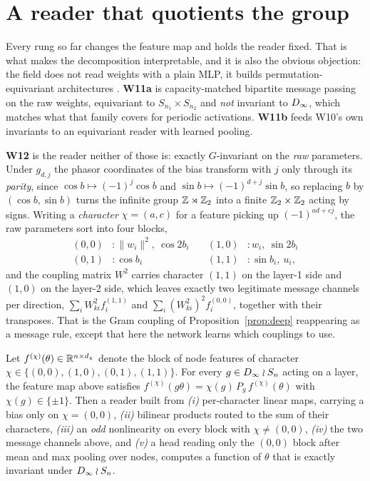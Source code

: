 \section{A reader that quotients the group}\label{sec:reader}

Every rung so far changes the feature map and holds the reader fixed. That is what makes the
decomposition interpretable, and it is also the obvious objection: the field does not read weights
with a plain MLP, it builds permutation-equivariant architectures
\citep{navon2023dws,zhou2023nfn,lim2024gmn,kofinas2024graph,tran2024monomial}. \textbf{W11a} is
capacity-matched bipartite message passing on the raw weights, equivariant to
$S_{n_1}\times S_{n_2}$ and \emph{not} invariant to $D_\infty$, which matches what that family covers
for periodic activations. \textbf{W11b} feeds W10's own invariants to an equivariant reader with
learned pooling.

\textbf{W12} is the reader neither of those is: exactly $G$-invariant on the \emph{raw} parameters.
Under $g_{d,j}$ the phasor coordinates of the bias transform with $j$ only through its
\emph{parity}, since $\cos b \mapsto (-1)^j \cos b$ and $\sin b \mapsto (-1)^{d+j}\sin b$, so
replacing $b$ by $(\cos b, \sin b)$ turns the infinite group $\mathbb{Z}\rtimes\mathbb{Z}_2$ into a finite
$\mathbb{Z}_2\times\mathbb{Z}_2$ acting by signs. Writing a \emph{character} $\chi=(a,c)$ for a feature picking up
$(-1)^{ad+cj}$, the raw parameters sort into four blocks,
\[
\begin{aligned}
(0,0)&: \|w_i\|^2,\ \cos 2b_i &\quad (1,0)&: w_i,\ \sin 2b_i\\
(0,1)&: \cos b_i &\quad (1,1)&: \sin b_i,\ u_i ,
\end{aligned}
\]
and the coupling matrix $W^2$ carries character $(1,1)$ on the layer-1 side and $(1,0)$ on the
layer-2 side, which leaves exactly two legitimate message channels per direction,
$\sum_i W^2_{ki} f_i^{(1,1)}$ and $\sum_i (W^2_{ki})^2 f_i^{(0,0)}$, together with their transposes.
That is the Gram coupling of Proposition~\ref{prop:deep} reappearing as a message rule, except that
here the network learns which couplings to use.

\begin{proposition}\label{prop:w12}
Let $f^{(\chi)}(\theta) \in \mathbb{R}^{n \times d_\chi}$ denote the block of node features of character
$\chi \in \{(0,0),(1,0),(0,1),(1,1)\}$. For every $g \in D_\infty \wr S_n$ acting on a layer, the
feature map above satisfies $f^{(\chi)}(g\theta) = \chi(g)\, P_g\, f^{(\chi)}(\theta)$ with
$\chi(g) \in \{\pm1\}$. Then a reader built from \emph{(i)} per-character linear maps, carrying a
bias only on $\chi = (0,0)$, \emph{(ii)} bilinear products routed to the sum of their characters,
\emph{(iii)} an \emph{odd} nonlinearity on every block with $\chi \ne (0,0)$, \emph{(iv)} the two
message channels above, and \emph{(v)} a head reading only the $(0,0)$ block after mean and max
pooling over nodes, computes a function of $\theta$ that is exactly invariant under
$D_\infty \wr S_n$.
\end{proposition}

